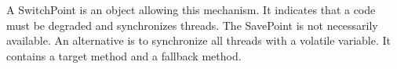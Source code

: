 \documentclass{sigplanconf}
\def \VM{\ac{VM}\xspace}
\begin{document}
        A SwitchPoint is an object allowing this mechanism.
        It indicates that a code must be degraded and synchronizes threads.
        The SavePoint is not necessarily available.
        An alternative is to synchronize all threads with a volatile variable.
        It contains a target method and a fallback method.
        
        
% 
% 
% 
% 
\end{document}
